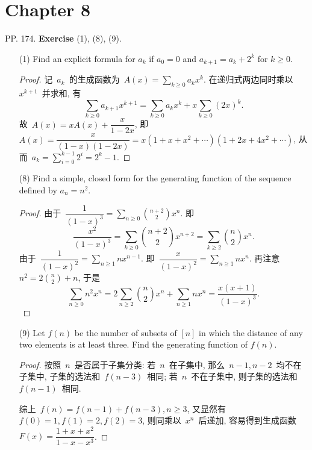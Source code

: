 \documentclass[UTF8,a4paper,10pt]{article}
\begin{document}
\section*{Chapter 8}
PP. 174. {\bf Exercise} (1), (8), (9).
\begin{enumerate}
	\item[(1)] Find an explicit formula for $a_k$ if $a_0 = 0$ and $a_{k+1} = a_k +2^k$ for $k\geqslant 0$.
	      \begin{proof}
		      记~$a_k$~的生成函数为~$A(x)=\sum_{k\geqslant 0} a_kx^k$. 在递归式两边同时乘以~$x^{k+1}$~并求和, 有
		      \[
			      \sum_{k\geqslant 0} a_{k+1}x^{k+1}=\sum_{k\geqslant 0} a_kx^k+x\sum_{k\geqslant 0}(2x)^k.
		      \]
		      故~$A(x)=xA(x)+\dfrac{x}{1-2x}$, 即~$A(x)=\dfrac{x}{(1-x)(1-2x)}=x(1+x+x^2+\cdots)(1+2x+4x^2+\cdots)$, 从而~$a_k=\sum_{i=0}^{k-1} 2^i=2^k-1$.
	      \end{proof}
	\item[(8)] Find a simple, closed form for the generating function of the sequence
	      defined by $a_n = n^2$.
	      \begin{proof}
		      由于~$\dfrac{1}{(1-x)^3}=\sum_{n\geqslant 0}\displaystyle\binom{n+2}{2}x^n$. 即
		      \[
			      \dfrac{x^2}{(1-x)^3}=\sum_{k\geqslant 0}\binom{n+2}{2}x^{n+2}=\sum_{k\geqslant 2}\binom{n}{2}x^n.
		      \]
		      由于~$\dfrac{1}{(1-x)^2}=\sum_{n\geqslant 1}nx^{n-1}$. 即~$\dfrac{x}{(1-x)^2}=\sum_{n\geqslant 1}nx^n$. 再注意~$n^2=2\displaystyle\binom{n}{2}+n$, 于是
		      \[
			      \sum_{n\geqslant 0}n^2x^n=2\sum_{n\geqslant 2}\binom{n}{2}x^n+\sum_{n\geqslant 1} nx^n=\dfrac{x(x+1)}{(1-x)^3}.
		      \]
	      \end{proof}
	\item[(9)] Let $f(n)$ be the number of subsets of $[n]$ in which the distance of any
	      two elements is at least three. Find the generating function of $f(n)$.
	      \begin{proof}
		      按照~$n$~是否属于子集分类: 若~$n$~在子集中, 那么~$n-1,n-2$~均不在子集中, 子集的选法和~$f(n-3)$~相同; 若~$n$~不在子集中, 则子集的选法和~$f(n-1)$~相同.

		      综上~$f(n)=f(n-1)+f(n-3), n\geqslant 3$, 又显然有~$f(0)=1, f(1)=2, f(2)=3$, 则同乘以~$x^n$~后递加, 容易得到生成函数~$F(x)=\dfrac{1+x+x^2}{1-x-x^3}$.
	      \end{proof}
\end{enumerate}
\end{document}
